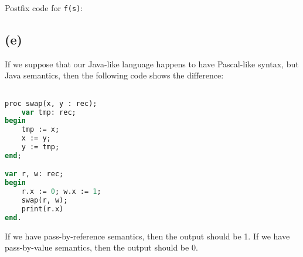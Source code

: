 Postfix code for \texttt{f(s)}:


\subsection{(e)}
If we suppose that our Java-like language happens to have Pascal-like syntax, but Java semantics, then the following code shows the difference:

\begin{lstlisting}[language=Pascal]

proc swap(x, y : rec);
    var tmp: rec;
begin
    tmp := x;
    x := y;
    y := tmp;
end;

var r, w: rec;
begin
    r.x := 0; w.x := 1;
    swap(r, w);
    print(r.x)
end.

\end{lstlisting}

If we have pass-by-reference semantics, then the output should be 1. If we have pass-by-value semantics, then the output should be 0.
